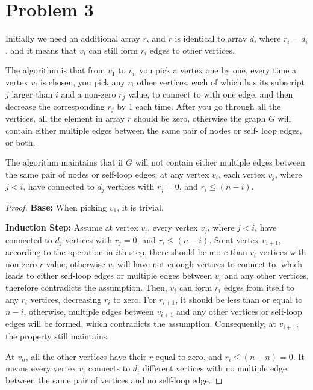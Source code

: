 \documentclass[a4paper,12pt]{article}
\begin{document}
\section*{Problem 3}
Initially we need an additional array $r$, and $r$ is identical to array 
$d$, where $r_i = d_i$, and it means that $v_i$ can still form $r_i$
edges to other vertices.

The algorithm is that from $v_1$ to $v_n$ you pick a vertex one by one,
every time a vertex $v_i$ is chosen, you pick any $r_i$ other vertices,
each of which has its subscript $j$ larger than $i$ and a non-zero $r_j$ 
value, to connect to with one edge, and then decrease the corresponding
$r_j$ by 1 each time. After you go through all the vertices, all the 
element in array $r$ should be zero, otherwise the graph $G$ will 
contain either multiple edges between the same pair of nodes or self-
loop edges, or both.

The algorithm maintains that if $G$ will not contain either multiple 
edges between the same pair of nodes or self-loop edges, at any vertex 
$v_i$, each vertex $v_j$, where $j<i$, have connected to $d_j$ vertices 
with $r_j = 0$, and $r_i \le (n-i)$.
\begin{proof}
\textbf{Base:} When picking $v_1$, it is trivial.

\textbf{Induction Step:} Assume at vertex $v_i$, every vertex $v_j$,
where $j<i$, have connected to $d_j$ vertices with $r_j = 0$, and 
$r_i \le (n-i)$. So at vertex $v_{i+1}$, according to the operation
in $i$th step, there should be more than $r_i$ vertices with non-zero
$r$ value, otherwise $v_i$ will have not enough vertices to connect to,
which leads to either self-loop edges or multiple edges between $v_i$
and any other vertices, therefore contradicts the assumption. Then, 
$v_i$ can form $r_i$ edges from itself to any $r_i$ vertices, decreasing
$r_i$ to zero. For $r_{i+1}$, it should be less than or equal to $n-i$,
otherwise, multiple edges between $v_{i+1}$ and any other vertices
or self-loop edges will be formed, which contradicts the assumption.
Consequently, at $v_{i+1}$, the property still maintains.

At $v_n$, all the other vertices have their $r$ equal to zero, and $r_i \le 
(n-n) = 0$. It means every vertex $v_i$ connects to $d_i$ different
vertices with no multiple edge between the same pair of vertices and
no self-loop edge.
\end{proof}

\end{document}
